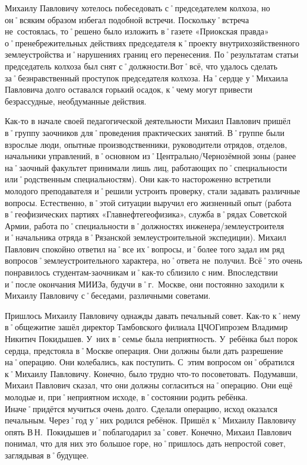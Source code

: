 Михаилу Павловичу хотелось побеседовать с˚председателем колхоза, но он˚всяким образом избегал подобной встречи. Поскольку˚встреча не~состоялась, то˚решено было изложить в˚газете «Приокская правда» о˚пренебрежительных действиях председателя к˚проекту внутрихозяйственного землеустройства и˚нарушениях границ его перенесения. По˚результатам статьи председатель колхоза был снят с˚должности.Вот˚всё, что удалось сделать за˚безнравственный проступок председателя колхоза. На˚сердце у˚Михаила Павловича долго оставался горький осадок, к˚чему могут привести безрассудные, необдуманные действия.

Как-то в начале своей педагогической деятельности Михаил Павлович пришёл в˚группу заочников для˚проведения практических занятий. В˚группе были взрослые люди, опытные производственники, руководители отрядов, отделов, начальники управлений, в˚основном из˚Центрально\-/Чернозёмной зоны (ранее на˚заочный факультет принимали лишь лиц, работающих по˚специальности или˚родственным специальностям). Они как-то настороженно встретили  молодого преподавателя и˚решили устроить проверку, стали задавать различные вопросы. Естественно, в˚этой ситуации выручил его жизненный опыт (работа в˚геофизических партиях «Главнефтегеофизика», служба в˚рядах Советской Армии, работа по˚специальности в˚должностях инженера\-/землеустроителя и˚начальника отряда в˚Рязанской землеустроительной экспедиции). Михаил Павлович спокойно ответил на˚все их˚вопросы, и˚более того задал им ряд вопросов˚землеустроительного характера, но˚ответа не~получил. Всё˚это очень понравилось студентам-заочникам и˚как-то сблизило с ним. Впоследствии и˚после окончания МИИЗа, будучи в˚г.~Москве, они постоянно заходили к Михаилу Павловичу с˚беседами, различными советами. 

Пришлось Михаилу Павловичу однажды давать печальный совет. Как-то к˚нему в˚общежитие зашёл директор Тамбовского филиала ЦЧОГипрозем Владимир Никитич Покидышев. У~них в˚семье была неприятность. У~ребёнка был порок сердца, предстояла в˚Москве операция. Они должны были дать разрешение на˚операцию. Они колебались, как поступить. С~этим вопросом он˚обратился к˚Михаилу Павловичу. Конечно, было трудно что-то посоветовать. Подумавши, Михаил Павлович сказал, что они должны согласиться на˚операцию. Они ещё молодые и, при˚неприятном исходе, в˚состоянии родить ребёнка. Иначе˚придётся мучиться очень долго. Сделали операцию, исход оказался печальным. Через˚год у˚них родился ребёнок. Пришёл к˚Михаилу Павловичу опять В\,Н.~Покидышев и˚поблагодарил за˚совет. Конечно, Михаил Павлович понимал, что для них это большое горе, но˚пришлось дать непростой совет, заглядывая в˚будущее.

